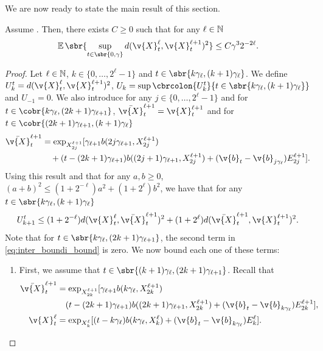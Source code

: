 We are now ready to state the main result of this section.

\begin{proposition}
	\label{prop:bound_square}
	Assume .
	Then, there exists \(C \geq 0\) such that for any \(\ell \in \mathbb{N}\) \begin{equation} { \E\sbr{\sup_{t \in \sbr{0, \gamma}} d(\v{X}_t^\ell, \v{X}_t^{\ell+1})^2} \leq C \gamma^3 2^{-2\ell} .
		}
	\end{equation}
\end{proposition}

\begin{proof}{}{}
	Let \(\ell \in \mathbb{N}\), \(k \in \{0, \dots, 2^{\ell} - 1\}\) and \(t \in \sbr{k \gamma_\ell, (k+1) \gamma_\ell}\).
	We define \(U_k^t = d(\v{X}_t^\ell, \v{X}_{t}^{\ell+1})^2\), \(U_k = \sup \cbrcolon{U_k^t}{t \in \sbr{k \gamma_\ell, (k+1) \gamma_\ell}}\) and \(U_{-1}=0\).
	We also introduce for any \(j \in \{0, \dots, 2^{\ell} - 1\}\) and for \(t \in \cobr{k \gamma_\ell, (2k+1) \gamma_{\ell+1}}\), \(\bar{\v{X}}_t^{\ell+1} = \v{X}_t^{\ell+1}\) and for \(t \in \cobr{(2k+1) \gamma_{\ell+1}, (k+1) \gamma_{\ell}}\) \begin{align} \bar{\v{X}}_{t}^{\ell+1} & = \exp_{X_{2j}^{\ell+1}}[\gamma_{\ell+1} b(2 j \gamma_{\ell + 1}, X_{2j}^{\ell+1}) \\ & \quad + (t - (2k+1)\gamma_{\ell+1}) b((2j+1) \gamma_{\ell + 1}, X_{2j}^{\ell+1}) + (\v{b}_{t} - \v{b}_{j \gamma_\ell}) E_{2j}^{\ell+1} ] .
	\end{align}
	Using this result and that for any \(a,b \geq0\), \((a+b)^2 \leq (1+2^{-\ell}) a^2 + (1 +2^\ell)b^2\), we have that for any \(t \in \sbr{k \gamma_\ell, (k+1) \gamma_\ell}\) \begin{equation} \label{eq:inter_boundi_bound} { U_{k+1}^t \leq (1 + 2^{-\ell}) d(\v{X}_{t}^\ell, \bar{\v{X}}_{t}^{\ell+1})^2 + (1 + 2^{\ell}) d(\bar{\v{X}}_{t}^{\ell+1}, \v{X}_{t}^{\ell+1})^2 .
		}
	\end{equation}
	Note that for \(t \in \sbr{k\gamma_\ell, (2k+1) \gamma_{\ell+1}}\), the second term in \eqref{eq:inter_boundi_bound} is zero.
	We now bound each one of these terms: \begin{enumerate}[wide, labelindent=0pt, label=(\alph*)] \item First, we assume that \(t \in \sbr{(k+1) \gamma_{\ell}, (2k+1) \gamma_{\ell+1}}\).
		      Recall that \begin{align} \bar{\v{X}}_{t}^{\ell+1} & = \exp_{X_{2k}^{\ell+1}}[\gamma_{\ell+1}b(k \gamma_{\ell }, X_{2k}^{\ell+1}) \\ & \quad (t - (2k+1)\gamma_{\ell+1}) b((2 k+1) \gamma_{\ell + 1}, X_{2k}^{\ell+1}) + (\v{b}_{t} - \v{b}_{k \gamma_\ell}) E_{2k}^{\ell+1} ] , \\ \v{X}_{t}^\ell &= \exp_{X_k^\ell}[( t - k\gamma_\ell) b(k \gamma_\ell, X_k^\ell) + (\v{b}_{t} - \v{b}_{k \gamma_\ell}) E_{k}^{\ell} ] .

\end{align}
\end{enumerate}
\end{proof}
